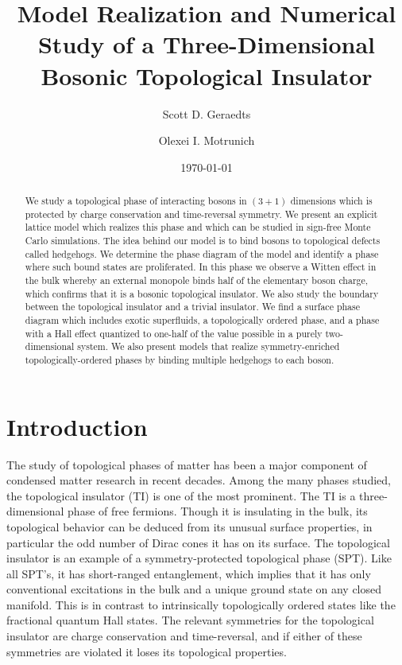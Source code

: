 \documentclass[prb,twocolumn]{revtex4-1}
\begin{document}
\title{Model Realization and Numerical Study of a Three-Dimensional Bosonic Topological Insulator}
\date{\today}
\pacs{}

\author{Scott D. Geraedts}
\author{Olexei I. Motrunich}

\begin{abstract}
We study a topological phase of interacting bosons in $(3+1)$ dimensions which is protected by charge conservation and time-reversal symmetry. We present an explicit lattice model which realizes this phase and which can be studied in sign-free Monte Carlo simulations. The idea behind our model is to bind bosons to topological defects called hedgehogs. We determine the phase diagram of the model and identify a phase where such bound states are proliferated.  In this phase we observe a Witten effect in the bulk whereby an external monopole binds half of the elementary boson charge, which confirms that it is a bosonic topological insulator. We also study the boundary between the topological insulator and a trivial insulator. We find a surface phase diagram which includes exotic superfluids, a topologically ordered phase, and a phase with a Hall effect quantized to one-half of the value possible in a purely two-dimensional system. We also present models that realize symmetry-enriched topologically-ordered phases by binding multiple hedgehogs to each boson. 
\end{abstract}
\maketitle

\section{Introduction}
The study of topological phases of matter has been a major component of condensed matter research in recent decades. Among the many phases studied, the topological insulator (TI) is one of the most prominent.\cite{KaneHassanRMP, QiZhangRMP} The TI is a three-dimensional phase of free fermions. Though it is insulating in the bulk, its topological behavior can be deduced from its unusual surface properties, in particular the odd number of Dirac cones it has on its surface. The topological insulator is an example of a symmetry-protected topological phase (SPT).  Like all SPT's, it has short-ranged entanglement, which implies that it has only conventional excitations in the bulk and a unique ground state on any closed manifold. This is in contrast to intrinsically topologically ordered states like the fractional quantum Hall states. The relevant symmetries for the topological insulator are charge conservation and time-reversal, and if either of these symmetries are violated it loses its topological properties.
\end{document}
